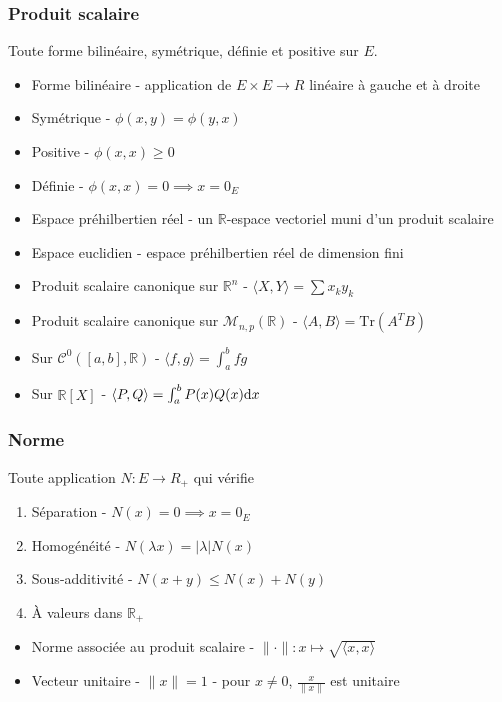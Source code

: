 \documentclass[openany]{book}
\begin{document}
\subsubsection{Produit scalaire}
Toute forme bilinéaire, symétrique, définie et positive sur $E$. 
\begin{itemize}
    \item Forme bilinéaire - application de $E \times E \rightarrow R$ linéaire à gauche et à droite
    \item Symétrique - $\phi (x, y) = \phi (y, x)$
    \item Positive - $\phi (x, x) \geq 0$
    \item Définie - $\phi(x, x) = 0 \implies x = 0_E$
    \item Espace préhilbertien réel - un $\mathbb{R}$-espace vectoriel muni d'un produit scalaire
    \item Espace euclidien - espace préhilbertien réel de dimension fini 
    \item Produit scalaire canonique sur $\mathbb{R}^n$ - $\langle X, Y \rangle = \sum x_k y_k$
    \item Produit scalaire canonique sur $\mathcal{M}_{n, p}(\mathbb{R})$ - $\langle A, B \rangle = \text{Tr}(A^T B)$
    \item Sur $\mathcal{C}^0([a, b], \mathbb{R})$ - $\langle f, g \rangle = \int_{a}^{b} fg$
    \item Sur $\mathbb{R}[X]$ - $\langle P, Q \rangle = \int_{a}^{b} P(x)Q(x) \text{d}x$
\end{itemize}

\subsubsection{Norme}
Toute application $N: E \rightarrow R_+$ qui vérifie
\begin{enumerate}
    \item Séparation - $N(x) = 0 \implies x = 0_E$
    \item Homogénéité - $N(\lambda x) = |\lambda| N(x)$
    \item Sous-additivité - $N(x+y) \leq N(x) + N(y)$
    \item À valeurs dans $\mathbb{R}_+$
\end{enumerate}

\begin{itemize}
    \item Norme associée au produit scalaire - $\|\cdot\| : x \mapsto \sqrt{\langle x, x \rangle}$ 
    \item Vecteur unitaire - $\|x\| = 1$ - pour $x \neq 0$, $ \frac{x}{\|x\|} $ est unitaire
\end{itemize}
\end{document}

